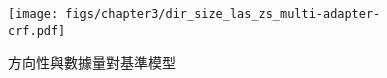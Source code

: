 \begin{figure}[h]
    \centering
    \texttt{[image: figs/chapter3/dir\_size\_las\_zs\_multi-adapter-crf.pdf]}
    \caption{方向性與數據量對基準模型}
    \label{fig:dir-size-las-zs-multi-adapter-crf}
\end{figure}